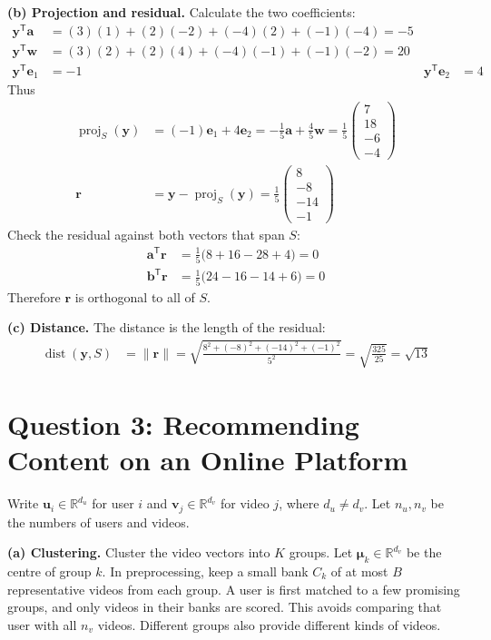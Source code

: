 \documentclass[11pt,a4paper]{article}
\newcommand{\R}{\mathbb{R}}
\newcommand{\norm}[1]{\lVert #1\rVert}
\newcommand{\dist}{\operatorname{dist}}
\begin{document}
\textbf{(b) Projection and residual.} Calculate the two coefficients:
\begin{align*}
\mathbf y^{\mathsf T}\mathbf a
&=(3)(1)+(2)(-2)+(-4)(2)+(-1)(-4)=-5\\
\mathbf y^{\mathsf T}\mathbf w
&=(3)(2)+(2)(4)+(-4)(-1)+(-1)(-2)=20\\
\mathbf y^{\mathsf T}\mathbf e_1&=-1
&\mathbf y^{\mathsf T}\mathbf e_2&=4
\end{align*}
Thus
\begin{align*}
\operatorname{proj}_{S}(\mathbf y)
&=(-1)\mathbf e_1+4\mathbf e_2
=-\frac15\mathbf a+\frac45\mathbf w
=\boxed{\frac15\begin{pmatrix}7\\18\\-6\\-4\end{pmatrix}}\\
\mathbf r
&=\mathbf y-\operatorname{proj}_{S}(\mathbf y)
=\boxed{\frac15\begin{pmatrix}8\\-8\\-14\\-1\end{pmatrix}}
\end{align*}
Check the residual against both vectors that span $S$:
\begin{align*}
\mathbf a^{\mathsf T}\mathbf r
&=\frac15\bigl(8+16-28+4\bigr)=0\\
\mathbf b^{\mathsf T}\mathbf r
&=\frac15\bigl(24-16-14+6\bigr)=0
\end{align*}
Therefore $\mathbf r$ is orthogonal to all of $S$.

\textbf{(c) Distance.} The distance is the length of the residual:
\begin{align*}
\dist(\mathbf y,S)
&=\norm{\mathbf r}
=\sqrt{\frac{8^2+(-8)^2+(-14)^2+(-1)^2}{5^2}}
=\sqrt{\frac{325}{25}}
=\boxed{\sqrt{13}}
\end{align*}

\clearpage
\section*{Question 3: Recommending Content on an Online Platform}
Write $\mathbf u_i\in\R^{d_u}$ for user $i$ and $\mathbf v_j\in\R^{d_v}$ for video $j$, where $d_u\ne d_v$. Let $n_u,n_v$ be the numbers of users and videos.

\textbf{(a) Clustering.} Cluster the video vectors into $K$ groups. Let $\boldsymbol\mu_k\in\R^{d_v}$ be the centre of group $k$. In preprocessing, keep a small bank $C_k$ of at most $B$ representative videos from each group. A user is first matched to a few promising groups, and only videos in their banks are scored. This avoids comparing that user with all $n_v$ videos. Different groups also provide different kinds of videos.
\end{document}
